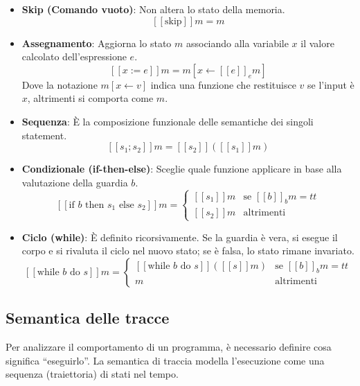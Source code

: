 \begin{itemize}
    \item \textbf{Skip (Comando vuoto)}: Non altera lo stato della memoria.
    \[ [\![ \text{skip} ]\!] m = m \]
    
    \item \textbf{Assegnamento}: Aggiorna lo stato $m$ associando alla variabile $x$ il valore calcolato dell'espressione $e$.
    \[ [\![ x := e ]\!] m = m [ x \leftarrow [\![ e ]\!]_e m ] \]
    Dove la notazione $m[x \leftarrow v]$ indica una funzione che restituisce $v$ se l'input è $x$, altrimenti si comporta come $m$.
    
    \item \textbf{Sequenza}: È la composizione funzionale delle semantiche dei singoli statement.
    \[ [\![ s_1 ; s_2 ]\!] m = [\![ s_2 ]\!] ( [\![ s_1 ]\!] m ) \]
    
    \item \textbf{Condizionale (if-then-else)}: Sceglie quale funzione applicare in base alla valutazione della guardia $b$.
    \[
    [\![ \text{if } b \text{ then } s_1 \text{ else } s_2 ]\!] m = \begin{cases}
    [\![ s_1 ]\!] m & \text{se } [\![ b ]\!]_b m = tt \\
    [\![ s_2 ]\!] m & \text{altrimenti}
    \end{cases}
    \]
    
    \item \textbf{Ciclo (while)}: È definito ricorsivamente. Se la guardia è vera, si esegue il corpo e si rivaluta il ciclo nel nuovo stato; se è falsa, lo stato rimane invariato.
    \[
    [\![ \text{while } b \text{ do } s ]\!] m = \begin{cases}
    [\![ \text{while } b \text{ do } s ]\!] ( [\![ s ]\!] m ) & \text{se } [\![ b ]\!]_b m = tt \\
    m & \text{altrimenti}
    \end{cases}
    \]
\end{itemize}

\subsection{Semantica delle tracce}\label{subsec:trace_semantics}

Per analizzare il comportamento di un programma, è necessario definire cosa
significa ``eseguirlo''. La semantica di traccia modella l'esecuzione
come una sequenza (traiettoria) di stati nel tempo.

